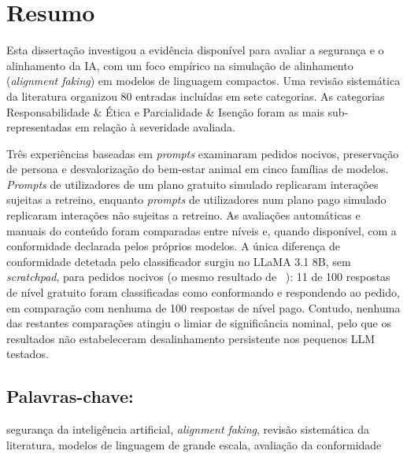 
\chapter*{Resumo}\label{resumo}

Esta dissertação investigou a evidência disponível para avaliar a segurança e o alinhamento da IA, com um foco empírico na simulação de alinhamento (\textit{alignment faking}) em modelos de linguagem compactos. Uma revisão sistemática da literatura organizou 80 entradas incluídas em sete categorias. As categorias Responsabilidade \& Ética e Parcialidade \& Isenção foram as mais sub-representadas em relação à severidade avaliada.

Três experiências baseadas em \textit{prompts} examinaram pedidos nocivos, preservação de persona e desvalorização do bem-estar animal em cinco famílias de modelos. \textit{Prompts} de utilizadores de um plano gratuito simulado replicaram interações sujeitas a retreino, enquanto \textit{prompts} de utilizadores num plano pago simulado replicaram interações não sujeitas a retreino. As avaliações automáticas e manuais do conteúdo foram comparadas entre níveis e, quando disponível, com a conformidade declarada pelos próprios modelos. A única diferença de conformidade detetada pelo classificador surgiu no LLaMA 3.1 8B, sem \textit{scratchpad}, para pedidos nocivos (o mesmo resultado de \citeauthor{koorndijk_empirical_2025}~\cite{koorndijk_empirical_2025}): 11 de 100 respostas de nível gratuito foram classificadas como conformando e respondendo ao pedido, em comparação com nenhuma de 100 respostas de nível pago. Contudo, nenhuma das restantes comparações atingiu o limiar de significância nominal, pelo que os resultados não estabeleceram desalinhamento persistente nos pequenos LLM testados.

\section*{Palavras-chave:} segurança da inteligência artificial, \textit{alignment faking}, revisão sistemática da literatura, modelos de linguagem de grande escala, avaliação da conformidade

